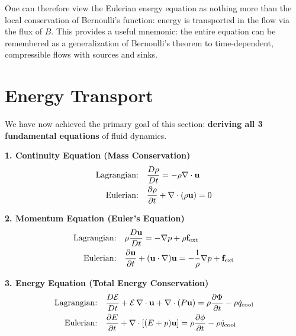 \begin{remark}
One can therefore view the Eulerian energy equation as nothing more than
the local conservation of Bernoulli’s function: energy is transported in
the flow via the flux of $B$. This provides a useful mnemonic: the entire
equation can be remembered as a generalization of Bernoulli’s theorem to
time-dependent, compressible flows with sources and sinks.
\end{remark}





\section{Energy Transport}

We have now achieved the primary goal of this section: \textbf{deriving all 3 fundamental equations} of fluid dynamics.

\begin{tcolorbox}[colback=blue!3!white, colframe=blue!50!black, title={Summary of Ideal Fluid Equations}]
\textbf{1. Continuity Equation (Mass Conservation)}  
\begin{align*}
\text{Lagrangian:} \quad & \frac{D\rho}{Dt} = -\rho \nabla \cdot {\bf u} \\
\text{Eulerian:} \quad & \frac{\partial \rho}{\partial t} + \nabla \cdot (\rho {\bf u}) = 0
\end{align*}

\vspace{0.5em}
\textbf{2. Momentum Equation (Euler's Equation)}  
\begin{align*}
\text{Lagrangian:} \quad & \rho \frac{D{\bf u}}{Dt} = -\nabla p + \rho {\bf f}_{\rm ext} \\
\text{Eulerian:} \quad & \frac{\partial {\bf u}}{\partial t} + ({\bf u} \cdot \nabla) {\bf u} = -\frac{1}{\rho} \nabla p + {\bf f}_{\rm ext}
\end{align*}

\vspace{0.5em}
\textbf{3. Energy Equation (Total Energy Conservation)}  
\begin{align*}
\text{Lagrangian:} \quad & \frac{D\mathcal{E}}{Dt} + \mathcal{E}\,\nabla\cdot{\bf u} 
+ \nabla\cdot(P{\bf u})
= \rho \frac{\partial \Phi}{\partial t} - \rho \dot{q}_{\rm cool} \\
\text{Eulerian:} \quad & \frac{\partial E}{\partial t} + \nabla \cdot \left[(E + p) {\bf u} \right] = \rho \frac{\partial \phi}{\partial t} - \rho \dot{q}_{\rm cool}
\end{align*}
\end{tcolorbox}

